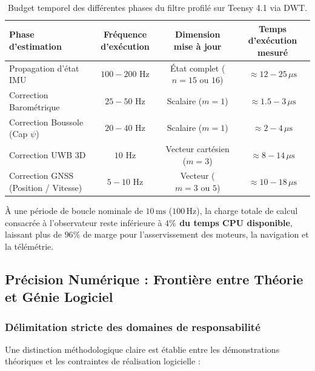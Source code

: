 \documentclass[../Implementation.tex]{subfiles}
\begin{document}
\begin{table}[htbp]
\centering
\small
\begin{tabular}{lccc}
\toprule
\textbf{Phase d'estimation} & \textbf{Fréquence d'exécution} & \textbf{Dimension mise à jour} & \textbf{Temps d'exécution mesuré} \\
\midrule
Propagation d'état IMU & $100 - 200\text{ Hz}$ & État complet ($n=15\text{ ou }16$) & $\approx 12 - 25\,\mu\text{s}$ \\
Correction Barométrique & $25 - 50\text{ Hz}$ & Scalaire ($m=1$) & $\approx 1.5 - 3\,\mu\text{s}$ \\
Correction Boussole (Cap $\psi$) & $20 - 40\text{ Hz}$ & Scalaire ($m=1$) & $\approx 2 - 4\,\mu\text{s}$ \\
Correction UWB 3D & $10\text{ Hz}$ & Vecteur cartésien ($m=3$) & $\approx 8 - 14\,\mu\text{s}$ \\
Correction GNSS (Position / Vitesse) & $5 - 10\text{ Hz}$ & Vecteur ($m=3\text{ ou }5$) & $\approx 10 - 18\,\mu\text{s}$ \\
\bottomrule
\end{tabular}
\caption{Budget temporel des différentes phases du filtre profilé sur Teensy 4.1 via DWT.}
\label{tab:budget_temporel_teensy}
\end{table}

À une période de boucle nominale de $10\,\text{ms}$ ($100\,\text{Hz}$), la charge totale de calcul consacrée à l'observateur reste inférieure à \textbf{$4\%$ du temps CPU disponible}, laissant plus de $96\%$ de marge pour l'asservissement des moteurs, la navigation et la télémétrie.

\subsection{Précision Numérique : Frontière entre Théorie et Génie Logiciel}

\subsubsection{Délimitation stricte des domaines de responsabilité}
Une distinction méthodologique claire est établie entre les démonstrations théoriques et les contraintes de réalisation logicielle :
\end{document}
